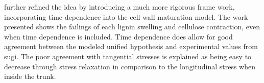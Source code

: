 \citet{Yamamoto_1998} further refined the idea by introducing a much more rigorous frame
work, incorporating time dependence into the cell wall maturation model. The
work presented shows the failings of each lignin swelling and cellulose
contraction, even when time dependence is included. Time dependence does allow
for good agreement between the modeled unified hypothesis and experimental
values from sugi. The poor agreement with tangential stresses is
explained as being easy to decrease through stress relaxation in comparison to
the longitudinal stress when inside the trunk.
